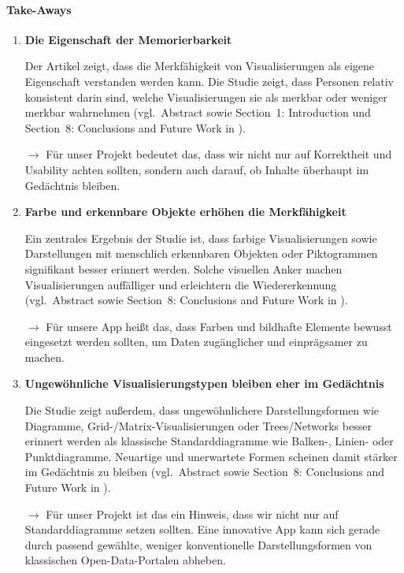 \paragraph{Take-Aways}
\begin{enumerate}
    \item \textbf{Die Eigenschaft der Memorierbarkeit}

    Der Artikel zeigt, dass die Merkf\"ahigkeit von Visualisierungen als eigene Eigenschaft verstanden werden kann. Die Studie zeigt, dass Personen relativ konsistent darin sind, welche Visualisierungen sie als merkbar oder weniger merkbar wahrnehmen (vgl.\ Abstract sowie Section~1: Introduction und Section~8: Conclusions and Future Work in \cite{Visualization}).

    $\rightarrow$ F\"ur unser Projekt bedeutet das, dass wir nicht nur auf Korrektheit und Usability achten sollten, sondern auch darauf, ob Inhalte \"uberhaupt im Ged\"achtnis bleiben.

    \item \textbf{Farbe und erkennbare Objekte erh\"ohen die Merkf\"ahigkeit}

    Ein zentrales Ergebnis der Studie ist, dass farbige Visualisierungen sowie Darstellungen mit menschlich erkennbaren Objekten oder Piktogrammen signifikant besser erinnert werden. Solche visuellen Anker machen Visualisierungen auff\"alliger und erleichtern die Wiedererkennung (vgl.\ Abstract sowie Section~8: Conclusions and Future Work in \cite{Visualization}).

    $\rightarrow$ F\"ur unsere App hei\ss t das, dass Farben und bildhafte Elemente bewusst eingesetzt werden sollten, um Daten zug\"anglicher und einpr\"agsamer zu machen.

    \item \textbf{Ungew\"ohnliche Visualisierungstypen bleiben eher im Ged\"achtnis}

    Die Studie zeigt au\ss erdem, dass ungew\"ohnlichere Darstellungsformen wie Diagramme, Grid-/Matrix-Visualisierungen oder Trees/Networks besser erinnert werden als klassische Standarddiagramme wie Balken-, Linien- oder Punktdiagramme. Neuartige und unerwartete Formen scheinen damit st\"arker im Ged\"achtnis zu bleiben (vgl.\ Abstract sowie Section~8: Conclusions and Future Work in \cite{Visualization}).

    $\rightarrow$ F\"ur unser Projekt ist das ein Hinweis, dass wir nicht nur auf Standarddiagramme setzen sollten. Eine innovative App kann sich gerade durch passend gew\"ahlte, weniger konventionelle Darstellungsformen von klassischen Open-Data-Portalen abheben.
\end{enumerate}
 
